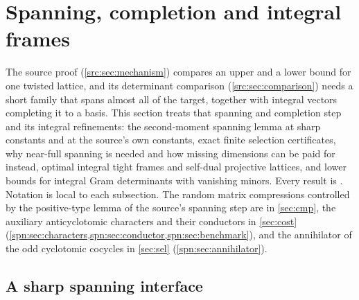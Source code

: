 \providecommand{\srcrem}{\mathrm{rem}}
\providecommand{\srcB}{\mathcal{B}}
\providecommand{\srcT}{\mathcal{T}}
\providecommand{\srcRR}{\mathcal{R}}
\providecommand{\srctr}{\mathsf{T}}
\section{Spanning, completion and integral frames}\label{sec:spn}

\providecommand{\spnHS}{\mathrm{HS}}
\providecommand{\spncodim}{\operatorname{codim}}
\providecommand{\spnim}{\operatorname{im}}
\providecommand{\spnE}{\mathbb{E}}
\providecommand{\spnP}{\mathbb{P}}
\providecommand{\spnTV}{d_{\mathrm{TV}}}
\providecommand{\spnStab}{\operatorname{Stab}}
\providecommand{\spnMat}{\operatorname{Mat}}
\providecommand{\spnDD}{\mathfrak{D}}
\providecommand{\spnT}{\mathsf{T}}
\providecommand{\spnqbin}[3]{\genfrac{[}{]}{0pt}{}{#1}{#2}_{#3}}
\providecommand{\spnOrth}{\mathcal{O}}
\providecommand{\spnTame}{\mathcal{T}}
\providecommand{\spnEmb}{\mathcal{E}}
\providecommand{\spnAlt}{\operatorname{Alt}}
\providecommand{\spncoker}{\operatorname{coker}}

The source proof (\cref{src:sec:mechanism}) compares an upper and a lower bound
for one twisted lattice, and its determinant comparison
(\cref{src:sec:comparison}) needs a short family that spans almost all of the
target, together with integral vectors completing it to a basis. This section
treats that spanning and completion step and its integral refinements: the
second-moment spanning lemma at sharp constants and at the source's own
constants, exact finite selection certificates, why near-full spanning is
needed and how missing dimensions can be paid for instead, optimal integral
tight frames and self-dual projective lattices, and lower bounds for integral
Gram determinants with vanishing minors. Every result is \stU. Notation is local
to each subsection. The random matrix compressions controlled by the
positive-type lemma of the source's spanning step are in \cref{sec:cmp}, the
auxiliary anticyclotomic characters and their conductors in \cref{sec:cost}
(\cref{spn:sec:characters,spn:sec:conductor,spn:sec:benchmark}), and the
annihilator of the odd cyclotomic cocycles in \cref{sec:sel}
(\cref{spn:sec:annihilator}).

\subsection{A sharp spanning interface}\label{spn:sec:spanning}

